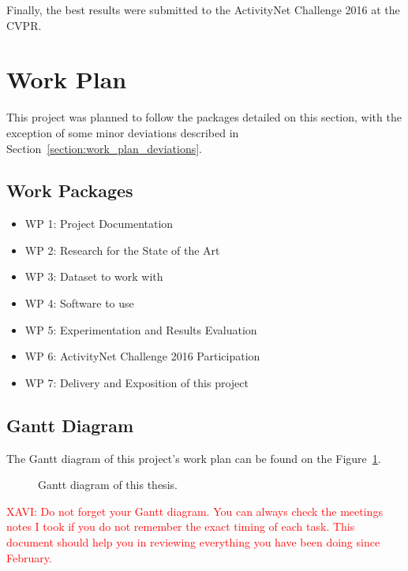 Finally, the best results were submitted to the ActivityNet Challenge 2016 at the CVPR.

\section{Work Plan}

This project was planned to follow the packages detailed on this section, with the exception of some minor deviations described in Section~\ref{section:work_plan_deviations}.

\subsection{Work Packages}

\begin{itemize}
    \item WP 1: Project Documentation
    \item WP 2: Research for the State of the Art
    \item WP 3: Dataset to work with
    \item WP 4: Software to use
    \item WP 5: Experimentation and Results Evaluation
    \item WP 6: ActivityNet Challenge 2016 Participation
    \item WP 7: Delivery and Exposition of this project
\end{itemize}

\subsection{Gantt Diagram}

The Gantt diagram of this project's work plan can be found on the Figure~\ref{fig:gantt_diagram}.

\begin{figure}[H]
\begin{center}
\end{center}
\caption{Gantt diagram of this thesis.}
\label{fig:gantt_diagram}
\end{figure}

\textcolor{red}{XAVI: Do not forget your Gantt diagram. You can always check the meetings notes I took if you do not remember the exact timing of each task. This document should help you in reviewing everything you have been doing since February.}


